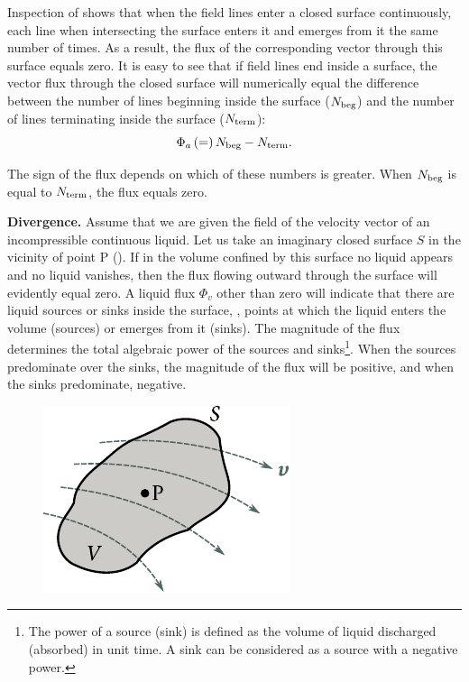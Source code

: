 Inspection of  shows that when the field lines enter a closed surface continuously, each line when intersecting the surface enters it and emerges from it the same number of times. As a result, the flux of the corresponding vector through this surface equals zero. It is easy to see that if field lines end inside a surface, the vector flux through the closed surface will numerically equal the difference between the number of lines beginning inside the surface ($N_{\text{beg}}$) and the number of lines terminating inside the surface ($N_{\text{term}}$):
\begin{equation}\label{eq:1_77}
	\Phi_a\, (=)\, N_{\text{beg}} - N_{\text{term}}.
\end{equation}

\noindent
The sign of the flux depends on which of these numbers is greater. When $N_{\text{beg}}$ is equal to $N_{\text{term}}$, the flux equals zero.

\textbf{Divergence.} Assume that we are given the field of the velocity vector of an incompressible continuous liquid. Let us take an imaginary closed surface $S$ in the vicinity of point P (). If in the volume confined by this surface no liquid appears and no liquid vanishes, then the flux flowing outward through the surface will evidently equal zero. A liquid flux $\Phi_v$ other than zero will indicate that there are liquid sources or sinks inside the surface, \ie, points at which the liquid enters the volume (sources) or emerges from it (sinks). The magnitude of the flux determines the total algebraic power of the sources and sinks\footnote{The power of a source (sink) is defined as the volume of liquid discharged (absorbed) in unit time. A sink can be considered as a source with a negative power.}. When the sources predominate over the sinks, the magnitude of the flux will be positive, and when the sinks predominate, negative.

\begin{figure}[t]
	\begin{center}
		\includegraphics[scale=1]{figures/ch_01/fig_1_23.pdf}
		\caption[]{}
		\label{fig:1_23}
	\end{center}
	\vspace{-0.8cm}
\end{figure}

